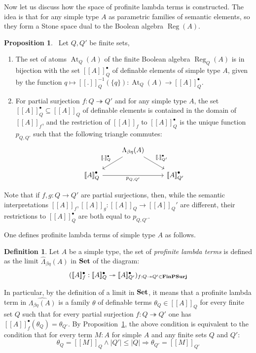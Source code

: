 \documentclass[8pt]{article}
\theoremstyle{definition}
\newtheorem{definition}{Definition}[section]
\theoremstyle{definition}
\theoremstyle{definition}
\theoremstyle{definition}
\theoremstyle{definition}
\theoremstyle{definition}
\theoremstyle{definition}
\newtheorem{prop}{Proposition}[section]
\theoremstyle{definition}
\theoremstyle{definition}
\theoremstyle{definition}
\theoremstyle{definition}
\theoremstyle{definition}
\theoremstyle{definition}
\theoremstyle{definition}
\theoremstyle{question}
\begin{document}
Now let us discuss how the space of profinite lambda terms is constructed. The idea is that for any
simple type $A$ as parametric families of semantic elements, so they form a Stone space dual to 
the Boolean algebra $\operatorname{Reg}(A)$.

\begin{prop}~\label{triangle:lemma}
  Let $Q, Q'$ be finite sets,

  \begin{enumerate} 
    \item The set of atoms $\operatorname{At}_Q(A)$ of the finite Boolean algebra $\operatorname{Reg}_Q(A)$
    is in bijection with the set $[\![A]\!]_{Q}^{\bullet}$ of definable elements of simple type $A$, given by the
    function $q \mapsto [\![.]\!]^{-1}_Q(\{ q \}) : \operatorname{At}_Q(A) \to [\![A]\!]_{Q}^{\bullet}$.
    \item For partial surjection $f : Q \twoheadrightarrow Q'$ and for any simple type $A$,
    the set $[\![A]\!]_Q^{\bullet} \subseteq [\![A]\!]_Q$ of definable elements is contained 
    in the domain of $[\![A]\!]_f$, and the restriction of $[\![A]\!]_f$ to $[\![A]\!]_Q^{\bullet}$
    is the unique function $p_{Q,Q'}$ such that the following triangle commutes:
    \[
    \begin{tikzcd}
      & \Lambda_{\beta\eta}(A) \ar[dl, "{[\![.]\!]}_Q^{\bullet}"'] \ar[dr, "{[\![.]\!]}_{Q'}^{\bullet}"] \\
    {[\![A]\!]}_Q^{\bullet} \ar[rr, "p_{Q,Q'}"'] && {[\![A]\!]}_{Q'}^{\bullet}
    \end{tikzcd}
    \]
  \end{enumerate}
\end{prop}

Note that if $f, g : Q \to Q'$ are partial surjections, then, while the semantic interpretations
$[\![A]\!]_f, [\![A]\!]_g : [\![A]\!]_Q \to [\![A]\!]_Q'$ are different, their restrictions 
to $[\![A]\!]^{\bullet}_Q$ are both equal to $p_{Q,Q'}$.

One defines profinite lambda terms of simple type $A$ as follows.
\begin{definition}
  Let $A$ be a simple type, the set of \emph{profinite lambda terms} is defined as the limit 
  $\widehat{\Lambda}_{\beta\eta}(A)$ in ${\bf Set}$ of the diagram:
  \[
  ([\![A]\!]_f^{\bullet} : [\![A]\!]_Q^{\bullet} \twoheadrightarrow [\![A]\!]_{Q'}^{\bullet})_{f : Q \twoheadrightarrow Q' \in {\bf FinPSurj}}
  \]
\end{definition}

In particular, by the definition of a limit in ${\bf Set}$, it means that a profinite lambda term 
in $\widehat{\Lambda_{\beta \eta}(A)}$ is a family $\theta$ of definable terms 
$\theta_Q \in [\![A]\!]_Q$ for every finite set $Q$ such that for every 
partial surjection $f : Q \twoheadrightarrow Q'$ one has $[\![A]\!]_f^{\bullet}(\theta_Q) = \theta_{Q'}$.
By Proposition~\ref{triangle:lemma}, the above condition is equivalent to the condition that for every 
term $M : A$ for simple $A$ and any finite sets $Q$ and $Q'$:
\[
\theta_Q = [\![M]\!]_Q \land |Q'| \leq |Q| \Rightarrow \theta_{Q'} = [\![M]\!]_{Q'}
\]
\end{document}
